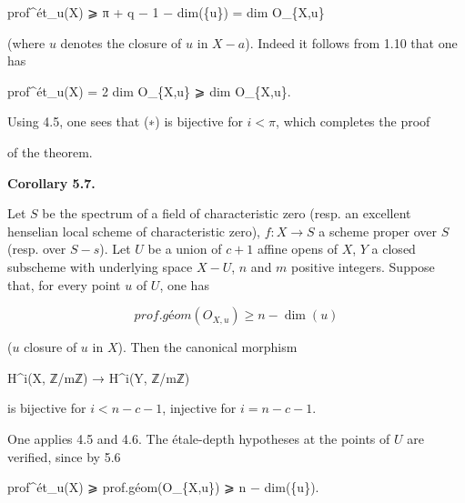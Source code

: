 \documentclass[
]{article}
\newenvironment{Shaded}{}{}
\newcommand{\NormalTok}[1]{#1}
\begin{document}
\begin{Shaded}
\begin{Highlighting}[]
\NormalTok{prof\^{}ét\_u(X) ⩾ π + q − 1 − dim(\{u\}) = dim O\_\{X,u\}}
\end{Highlighting}
\end{Shaded}

(where \({u}\) denotes the closure of \(u\) in \(X - {a}\)). Indeed it
follows from 1.10 that one has

\begin{Shaded}
\begin{Highlighting}[]
\NormalTok{prof\^{}ét\_u(X) = 2 dim O\_\{X,u\} ⩾ dim O\_\{X,u\}.}
\end{Highlighting}
\end{Shaded}

Using 4.5, one sees that (∗) is bijective for \(i < \pi\), which
completes the proof

of the theorem.

\textbf{Corollary 5.7.}

Let \(S\) be the spectrum of a field of characteristic zero (resp. an
excellent henselian local scheme of characteristic zero),
\(f : X \to S\) a scheme proper over \(S\) (resp. over \(S - {s}\)). Let
\(U\) be a union of \(c + 1\) affine opens of \(X\), \(Y\) a closed
subscheme with underlying space \(X - U\), \(n\) and \(m\) positive
integers. Suppose that, for every point \(u\) of \(U\), one has

\[
prof.géom(O_{X,u}) \geqslant n - \dim({u})
\]

(\({u}\) closure of \(u\) in \(X\)). Then the canonical morphism

\begin{Shaded}
\begin{Highlighting}[]
\NormalTok{H\^{}i(X, ℤ/mℤ) → H\^{}i(Y, ℤ/mℤ)}
\end{Highlighting}
\end{Shaded}

is bijective for \(i < n - c - 1\), injective for \(i = n - c - 1\).

One applies 4.5 and 4.6. The étale-depth hypotheses at the points of
\(U\) are verified, since by 5.6

\begin{Shaded}
\begin{Highlighting}[]
\NormalTok{prof\^{}ét\_u(X) ⩾ prof.géom(O\_\{X,u\}) ⩾ n − dim(\{u\}).}
\end{Highlighting}
\end{Shaded}
\end{document}
